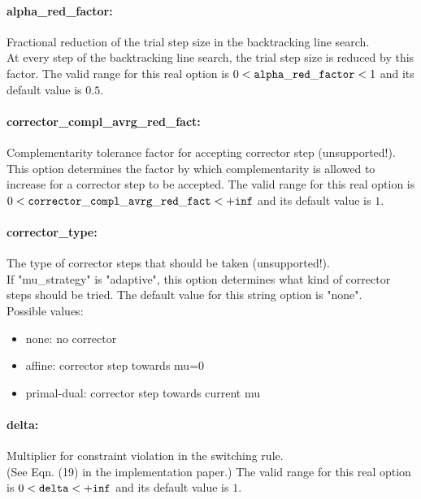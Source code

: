 \paragraph{alpha\_red\_factor:}\label{sec:alpha_red_factor} Fractional reduction of the trial step size in the backtracking line search. $\;$ \\
 At every step of the backtracking line search,
the trial step size is reduced by this factor. The valid range for this real option is 
$0 <  {\tt alpha\_red\_factor } <  1$
and its default value is $0.5$.


\paragraph{corrector\_compl\_avrg\_red\_fact:}\label{sec:corrector_compl_avrg_red_fact} Complementarity tolerance factor for accepting corrector step (unsupported!). $\;$ \\
 This option determines the factor by which
complementarity is allowed to increase for a
corrector step to be accepted. The valid range for this real option is 
$0 <  {\tt corrector\_compl\_avrg\_red\_fact } <  {\tt +inf}$
and its default value is $1$.


\paragraph{corrector\_type:}\label{sec:corrector_type} The type of corrector steps that should be taken (unsupported!). $\;$ \\
 If "mu\_strategy" is "adaptive", this option
determines what kind of corrector steps should be
tried.
The default value for this string option is "none".
\\ 
Possible values:
\begin{itemize}
   \item none: no corrector
   \item affine: corrector step towards mu=0
   \item primal-dual: corrector step towards current mu
\end{itemize}

\paragraph{delta:}\label{sec:delta} Multiplier for constraint violation in the switching rule. $\;$ \\
 (See Eqn. (19) in the implementation paper.) The valid range for this real option is 
$0 <  {\tt delta } <  {\tt +inf}$
and its default value is $1$.


